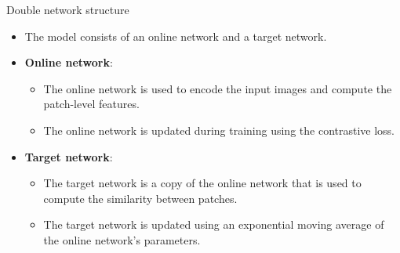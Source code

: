 \documentclass{beamer}
\begin{document}
  \begin{frame}{Double network structure}
      \begin{itemize}
              \item The model consists of  an online network and a target network.
              \item \textbf{Online network}:
                  \begin{itemize}
                          \item  The online network is used to encode the input images and compute the patch-level features.
                          \item The online network is updated during training using the contrastive loss.
                          \end{itemize}
                  \item \textbf{Target network}:
                          \begin{itemize}
                                \item The target network is a copy of the online network that is used to compute the similarity between patches.
                                \item The target network is updated using an exponential moving average of the online network's parameters.
                                \end{itemize}

                  \end{itemize}
      \end{frame}
\end{document}
